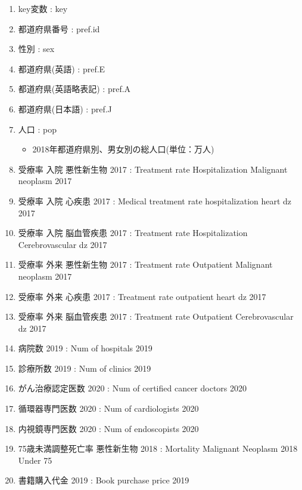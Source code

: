 \begin{multicols}{2}


\begin{enumerate}
  \item key変数 : key
  \item 都道府県番号 : pref.id
  \item 性別 : sex
  \item 都道府県(英語) : pref.E
  \item 都道府県(英語略表記) : pref.A
  \item 都道府県(日本語) : pref.J
  \item 人口 : pop
  \begin{itemize}
  \item
%
%
2018年都道府県別、男女別の総人口(単位：万人)
  \end{itemize}
    \item 受療率 入院 悪性新生物 2017  :  Treatment rate Hospitalization Malignant neoplasm 2017
  \item 受療率 入院 心疾患 2017  :  Medical treatment rate hospitalization heart dz 2017
  \item 受療率 入院 脳血管疾患 2017  :  Treatment rate Hospitalization Cerebrovascular dz 2017
  \item 受療率 外来 悪性新生物 2017  :  Treatment rate Outpatient Malignant neoplasm 2017
  \item 受療率 外来 心疾患 2017  :  Treatment rate outpatient heart dz 2017
  \item 受療率 外来 脳血管疾患 2017  :  Treatment rate Outpatient Cerebrovascular dz 2017
  \item 病院数 2019  :  Num of hospitals 2019
  \item 診療所数 2019  :  Num of clinics 2019
  \item がん治療認定医数 2020  :  Num of certified cancer doctors 2020
  \item 循環器専門医数 2020  :  Num of cardiologists 2020
  \item 内視鏡専門医数 2020  :  Num of endoscopists 2020
  \item 75歳未満調整死亡率 悪性新生物 2018  :  Mortality Malignant Neoplasm 2018 Under 75
  \item 書籍購入代金 2019  :  Book purchase price 2019

\end{enumerate}
\end{multicols}
